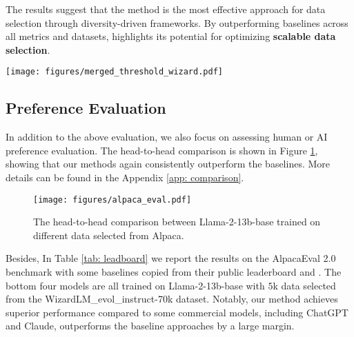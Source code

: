 The results suggest that the \two method is the most effective approach for data selection through diversity-driven frameworks.
By outperforming baselines across all metrics and datasets, \two highlights its potential for optimizing \textbf{scalable data selection}. 

 

\begin{figure*}[ht]
\centering
\texttt{[image: figures/merged\_threshold\_wizard.pdf]}
\caption{The comparison of \one (\textbf{Top}) and \two (\textbf{Bottom}) under different SAE thresholds.}\label{fig: threshold_wizard}
\end{figure*} 





\subsection{Preference Evaluation}
In addition to the above evaluation, we also focus on assessing human or AI preference evaluation. The head-to-head comparison is shown in Figure \ref{fig: headtohead1}, showing that our methods again consistently outperform the baselines. More details can be found in the Appendix \ref{app: comparison}.

\begin{figure}[h]
\centering
\texttt{[image: figures/alpaca\_eval.pdf]}
\caption{The head-to-head comparison between Llama-2-13b-base trained on different data selected from Alpaca.}\label{fig: headtohead1}
\end{figure} 

Besides, In Table \ref{tab: leadboard} we report the results on the AlpacaEval 2.0 benchmark with some baselines copied from their public leaderboard and \citep{zhaolong}. The bottom four models are all trained on Llama-2-13b-base with $5$k data selected from the WizardLM\_evol\_instruct-70k dataset. Notably, our method achieves superior performance compared to some commercial models, including ChatGPT and Claude, outperforms the baseline approaches by a large margin. %

